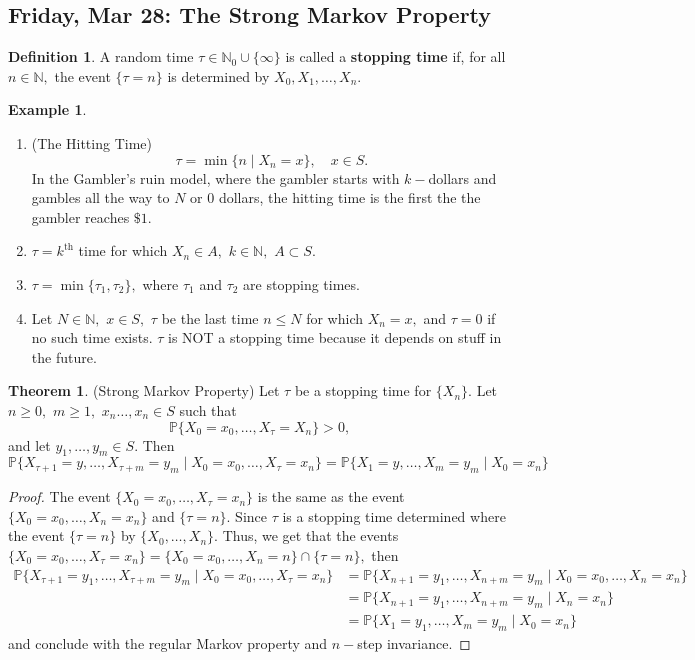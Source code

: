 \documentclass[10pt, oneside]{article}
\newcommand{\bbP}{\mathbb{P}}
\newcommand{\bbN}{\mathbb{N}}
\theoremstyle{definition}
\newtheorem{exmp}{Example}[section]
\newtheorem{thm}{Theorem}
\newtheorem{defn}{Definition}
\begin{document}
\newpage
\subsection{Friday, Mar 28: The Strong Markov Property}

\begin{defn}
    A random time $\tau \in \bbN_0 \cup \{\infty\}$ is called a \textbf{stopping time} if, for all $n \in \bbN,$ the event $\{\tau = n\}$ is determined by $X_0, X_1, \dots, X_n.$ 
\end{defn}
\begin{exmp}
\begin{enumerate}
    \item (The Hitting Time) \[\tau = \min\{n \mid X_n = x\}, \quad x\in S.\]
    In the Gambler's ruin model, where the gambler starts with $k-$dollars and gambles all the way to $N$ or $0$ dollars, the hitting time is the first the the gambler reaches $\$1$.
    \item $\tau = k^\text{th}$ time for which $X_n \in A,$ $k\in \bbN,$ $A \subset S.$
    \item $\tau = \min\{\tau_1, \tau_2\},$ where $\tau_1$ and $\tau_2$ are stopping times. 
    \item Let $N \in \bbN,$ $x\in S,$ $\tau$ be the last time $n \leq N$ for which $X_n = x,$ and $\tau  = 0$ if no such time exists. $\tau$ is NOT a stopping time because it  depends on stuff in the future.
\end{enumerate}
\end{exmp}

\begin{thm}
    (Strong Markov Property) Let $\tau$ be a stopping time for $\{X_n\}.$ Let $n \geq 0,$ $m\geq 1,$ $x_n \dots, x_n \in S$ such that 
    \[\bbP\{X_0 = x_0, \dots, X_\tau = X_n\} >0,\] and 
    let $y_1, \dots, y_m \in S.$ Then 
    \[\bbP\{X_{\tau + 1} = y, \dots, X_{\tau + m} = y_m\mid X_0 = x_0, \dots, X_\tau = x_n\} =\bbP\{X_{1} = y, \dots, X_{ m} = y_m\mid X_0 = x_n\}\]
\end{thm}
\begin{proof}
    The event $\{X_0 = x_0, \dots, X_\tau = x_n\}$ is the same as the event $\{X_0 = x_0, \dots, X_n = x_n\}$ and $\{\tau = n\}.$ Since $\tau$ is a stopping time determined where the event $\{\tau = n\}$ by $\{X_0, \dots, X_n\}.$ Thus, we get that the events $\{X_0 = x_0, \dots, X_\tau = x_n\} = \{X_0 = x_0, \dots, X_n = n\}\cap \{\tau = n\},$ then 
    \begin{align*}
        \bbP\{X_{\tau + 1} = y_1, \dots, X_{\tau  + m} = y_m \mid X_0 = x_0, \dots, X_\tau = x_n\} &= \bbP\{X_{n + 1} = y_1, \dots, X_{n  + m} = y_m \mid X_0 = x_0, \dots, X_n = x_n\}\\
        &= \bbP\{X_{n + 1} = y_1, \dots, X_{n  + m} = y_m \mid X_n = x_n\}\\
        &= \bbP\{X_{1} = y_1, \dots, X_{ m} = y_m \mid X_0 = x_n\}
    \end{align*} and conclude with the regular Markov property and $n-$step invariance.
\end{proof}
\end{document}
